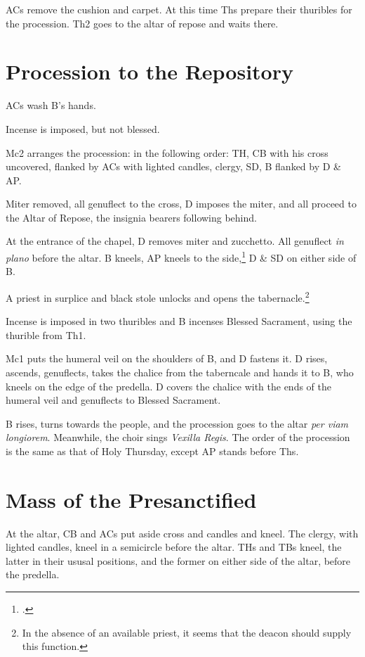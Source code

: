 {\rubric ACs remove the cushion and carpet. At this time Ths prepare their
thuribles for the procession. Th2 goes to the altar of repose and waits there.

\section{Procession to the Repository}

\rubric ACs wash B's hands.

\rubric Incense is imposed, but not blessed.

\rubric Mc2 arranges the procession: in the following order: TH, CB with his
cross uncovered, flanked by ACs with lighted candles, clergy, SD, B flanked by
D \& AP.

\rubric Miter removed, all genuflect to the cross, D imposes the miter, and all
proceed to the Altar of Repose, the insignia bearers following behind. 

\rubric At the entrance of the chapel, D removes miter and zucchetto. All
genuflect \textit{in plano} before the altar. B kneels, AP kneels to the
side,\footcite[][]{sterkyFP:2} D \& SD on either side of B.

\rubric A priest in surplice and black stole unlocks and opens the
tabernacle.\footnote{In the absence of an available priest, it seems that the
deacon should supply this function.}

\rubric Incense is imposed in two thuribles and B incenses Blessed
Sacrament, using the thurible from Th1.

\rubric Mc1 puts the humeral veil on the shoulders of B, and D fastens it. D
rises, ascends, genuflects, takes the chalice from the taberncale and hands it
to B, who kneels on the edge of the predella. D covers the chalice with the ends
of the humeral veil and genuflects to Blessed Sacrament.

\rubric B rises, turns towards the people, and the procession goes to the altar
\textit{per viam longiorem}. Meanwhile, the choir sings \textit{Vexilla Regis}.
The order of the procession is the same as that of Holy Thursday, except AP
stands before Ths.

\section{Mass of the Presanctified}

\rubric At the altar, CB and ACs put aside cross and candles and kneel. The
clergy, with lighted candles, kneel in a semicircle before the altar. THs and
TBs kneel, the latter in their ususal positions, and the former on either side
of the altar, before the predella.

}
